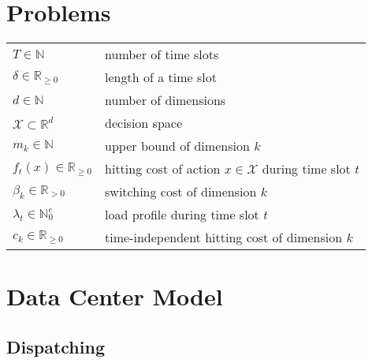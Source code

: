 \label{chapter:notation}

\section*{Problems}

\begin{tabularx}{\textwidth}{lX}
    $T \in \mathbb{N}$ & number of time slots \\
    $\delta \in \mathbb{R}_{\geq 0}$ & length of a time slot \\
    $d \in \mathbb{N}$ & number of dimensions \\
    $\mathcal{X} \subset \mathbb{R}^d$ & decision space \\
    $m_k \in \mathbb{N}$ & upper bound of dimension $k$ \\
    $f_t(x) \in \mathbb{R}_{\geq 0}$ & hitting cost of action $x \in \mathcal{X}$ during time slot $t$ \\
    $\beta_k \in \mathbb{R}_{>0}$ & switching cost of dimension $k$ \\
    $\lambda_t \in \mathbb{N}_0^e$ & load profile during time slot $t$ \\
    $c_k \in \mathbb{R}_{\geq 0}$ & time-independent hitting cost of dimension $k$ \\
\end{tabularx}

\section*{Data Center Model}

\subsection*{Dispatching}


